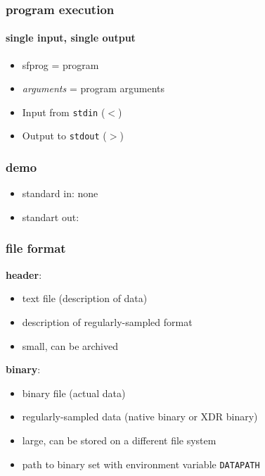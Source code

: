 \begin{frame} \frametitle{program execution}
  \framesubtitle{single input, single output}

  
  \begin{itemize}
  \item sfprog = \mg program
  \item \emph{arguments} = program arguments
  \item Input from \texttt{stdin} ($<$)
  \item Output to \texttt{stdout} ($>$)
  \end{itemize}
  
\end{frame}
\cwpnote{}

\begin{frame}[fragile] \frametitle{demo}

  
  \vfill
  \begin{itemize}
  \item standard in: none
  \item standart out: 
  \end{itemize}
  
\end{frame}
\cwpnote{}

\begin{frame} \frametitle{file format}

  \textbf{header}:
  \begin{itemize}
  \item text file (description of data)
  \item description of regularly-sampled format
  \item small, can be archived
  \end{itemize}
  
  \textbf{binary}:
  \begin{itemize}
  \item binary file (actual data)
  \item regularly-sampled data (native binary or XDR binary)
  \item large, can be stored on a different file system
  \item path to binary set with environment variable \texttt{DATAPATH}
  \end{itemize}
  
\end{frame}
\cwpnote{}

